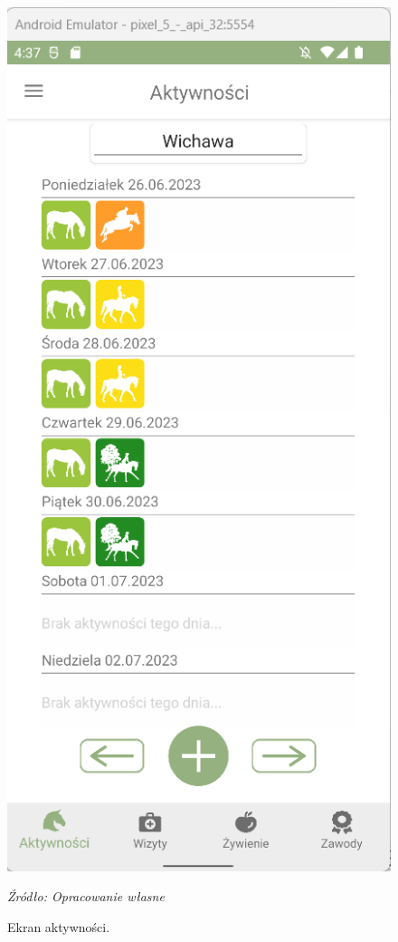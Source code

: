 \documentclass[12pt,oneside]{report}
\begin{document}
\begin{figure}
	\centering
	\includegraphics[scale=0.8]{ActivityView}
	\caption{Ekran aktywności.}
	\textit{Źródło: Opracowanie własne}
	\label{ActivityView}
\end{figure} 
\end{document}
